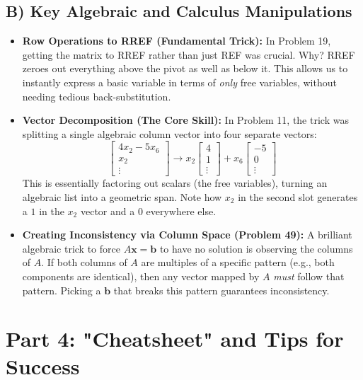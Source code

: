 \documentclass[11pt]{article}
\begin{document}
\subsection{B) Key Algebraic and Calculus Manipulations}
\begin{itemize}
    \item \textbf{Row Operations to RREF (Fundamental Trick):} In Problem 19, getting the matrix to RREF rather than just REF was crucial. Why? RREF zeroes out everything above the pivot as well as below it. This allows us to instantly express a basic variable in terms of \textit{only} free variables, without needing tedious back-substitution.
    \item \textbf{Vector Decomposition (The Core Skill):} In Problem 11, the trick was splitting a single algebraic column vector into four separate vectors: 
    \[
    \begin{bmatrix} 4x_2 - 5x_6 \\ x_2 \\ \vdots \end{bmatrix} \longrightarrow x_2 \begin{bmatrix} 4 \\ 1 \\ \vdots \end{bmatrix} + x_6 \begin{bmatrix} -5 \\ 0 \\ \vdots \end{bmatrix}
    \]
    This is essentially factoring out scalars (the free variables), turning an algebraic list into a geometric span. Note how $x_2$ in the second slot generates a $1$ in the $x_2$ vector and a $0$ everywhere else.
    \item \textbf{Creating Inconsistency via Column Space (Problem 49):} A brilliant algebraic trick to force $A\mathbf{x} = \mathbf{b}$ to have no solution is observing the columns of $A$. If both columns of $A$ are multiples of a specific pattern (e.g., both components are identical), then any vector mapped by $A$ \textit{must} follow that pattern. Picking a $\mathbf{b}$ that breaks this pattern guarantees inconsistency.
\end{itemize}

\newpage
\section{Part 4: "Cheatsheet" and Tips for Success}
\end{document}
